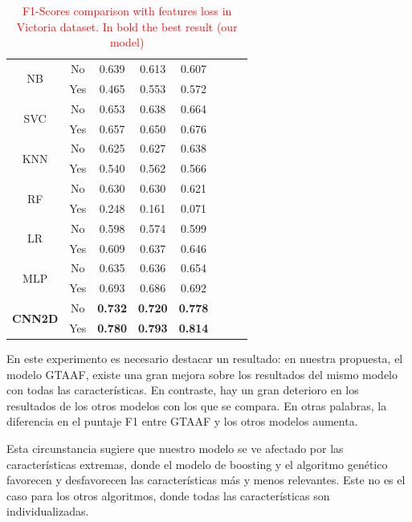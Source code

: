 \documentclass{uathesis-es}
\begin{document}
{\begin{table}[H]
\begin{center}
\begin{tabular}{|c|c||c|c|c|c|c|c|}
				\multirow{2}{*}{NB} &
				No & 0.639 & 0.613 & 0.607\\ &
				Yes & 0.465 & 0.553 & 0.572 \\ \hline \hline
				\multirow{2}{*}{SVC} &
				No & 0.653 & 0.638 & 0.664\\ &
				Yes & 0.657 & 0.650 & 0.676 \\ \hline \hline
				\multirow{2}{*}{KNN} &
				No & 0.625 & 0.627 & 0.638\\ &
				Yes & 0.540 & 0.562 & 0.566 \\ \hline \hline
				\multirow{2}{*}{RF} &
				No & 0.630 & 0.630 & 0.621\\ &
				Yes & 0.248 & 0.161 & 0.071 \\ \hline \hline
				\multirow{2}{*}{LR} &
				No & 0.598 & 0.574 & 0.599\\ &
				Yes & 0.609 & 0.637 & 0.646 \\ \hline \hline
				\multirow{2}{*}{MLP} &
				No & 0.635 & 0.636 & 0.654\\ &
				Yes & 0.693 & 0.686 & 0.692 \\ \hline \hline
				\multirow{2}{*}{\textbf{CNN2D}} &
				No & \textbf{0.732} & \textbf{0.720} & \textbf{0.778}\\ &
				Yes & \textbf{0.780} & \textbf{0.793} & \textbf{0.814} \\ \hline \hline
			\end{tabular}
		\end{center}
		\caption{\textcolor{red}{F1-Scores comparison with features loss in Victoria dataset. In bold the best result (our model)}}
		\label{Victorialoss}
	\end{table}
	
	En este experimento es necesario destacar un resultado: en nuestra propuesta, el modelo GTAAF, existe una gran mejora sobre los resultados del mismo modelo con todas las características. En contraste, hay un gran deterioro en los resultados de los otros modelos con los que se compara. En otras palabras, la diferencia en el puntaje F1 entre GTAAF y los otros modelos aumenta.
	
	Esta circunstancia sugiere que nuestro modelo se ve afectado por las características extremas, donde el modelo de boosting y el algoritmo genético favorecen y desfavorecen las características más y menos relevantes. Este no es el caso para los otros algoritmos, donde todas las características son individualizadas.
	
}
\end{document}
